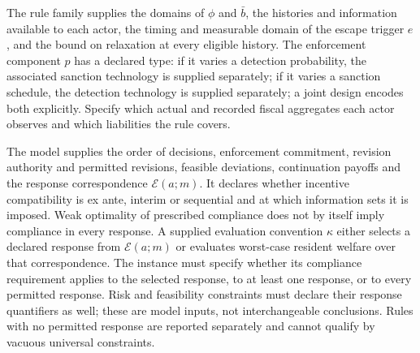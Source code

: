 \documentclass[11pt,a4paper]{article}
\begin{document}
The rule family supplies the domains of \(\phi\) and \(\bar b\), the histories and information available to each actor, the timing and measurable domain of the escape trigger \(e\), and the bound on relaxation at every eligible history. The enforcement component \(p\) has a declared type: if it varies a detection probability, the associated sanction technology is supplied separately; if it varies a sanction schedule, the detection technology is supplied separately; a joint design encodes both explicitly. Specify which actual and recorded fiscal aggregates each actor observes and which liabilities the rule covers.

The model supplies the order of decisions, enforcement commitment, revision authority and permitted revisions, feasible deviations, continuation payoffs and the response correspondence \(\mathcal E(a;m)\). It declares whether incentive compatibility is ex ante, interim or sequential and at which information sets it is imposed. Weak optimality of prescribed compliance does not by itself imply compliance in every response. A supplied evaluation convention \(\kappa\) either selects a declared response from \(\mathcal E(a;m)\) or evaluates worst-case resident welfare over that correspondence. The instance must specify whether its compliance requirement applies to the selected response, to at least one response, or to every permitted response. Risk and feasibility constraints must declare their response quantifiers as well; these are model inputs, not interchangeable conclusions. Rules with no permitted response are reported separately and cannot qualify by vacuous universal constraints.
\end{document}
